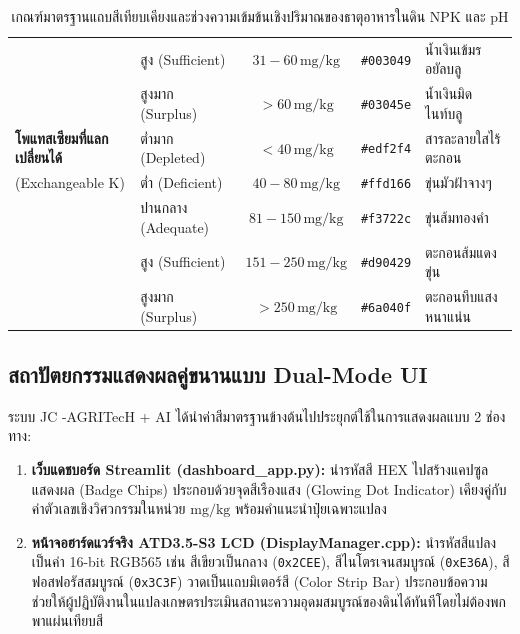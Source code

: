 \begin{table}[htbp]
\begin{tabularx}{\textwidth}{p{3.2cm} p{3.4cm} c c Y}
& สูง (Sufficient) & $31 - 60\,\text{mg/kg}$ & \texttt{\#003049} & น้ำเงินเข้มรอยัลบลู \\
& สูงมาก (Surplus) & $> 60\,\text{mg/kg}$ & \texttt{\#03045e} & น้ำเงินมิดไนท์บลู \\
\midrule
\textbf{โพแทสเซียมที่แลกเปลี่ยนได้} & ต่ำมาก (Depleted) & $< 40\,\text{mg/kg}$ & \texttt{\#edf2f4} & สารละลายใสไร้ตะกอน \\
(Exchangeable K) & ต่ำ (Deficient) & $40 - 80\,\text{mg/kg}$ & \texttt{\#ffd166} & ขุ่นมัวฝ้าจางๆ \\
& ปานกลาง (Adequate) & $81 - 150\,\text{mg/kg}$ & \texttt{\#f3722c} & ขุ่นส้มทองคำ \\
& สูง (Sufficient) & $151 - 250\,\text{mg/kg}$ & \texttt{\#d90429} & ตะกอนส้มแดงขุ่น \\
& สูงมาก (Surplus) & $> 250\,\text{mg/kg}$ & \texttt{\#6a040f} & ตะกอนทึบแสงหนาแน่น \\
\bottomrule
\end{tabularx}
\caption{เกณฑ์มาตรฐานแถบสีเทียบเคียงและช่วงความเข้มข้นเชิงปริมาณของธาตุอาหารในดิน NPK และ pH}
\label{tab:soil_color_chart_standards}
\end{table}

\subsection{สถาปัตยกรรมแสดงผลคู่ขนานแบบ Dual-Mode UI}

ระบบ JC -AGRITecH + AI ได้นำค่าสีมาตรฐานข้างต้นไปประยุกต์ใช้ในการแสดงผลแบบ 2 ช่องทาง:
\begin{enumerate}
    \item \textbf{เว็บแดชบอร์ด Streamlit (dashboard\_app.py):} นำรหัสสี HEX ไปสร้างแคปซูลแสดงผล (Badge Chips) ประกอบด้วยจุดสีเรืองแสง (Glowing Dot Indicator) เคียงคู่กับค่าตัวเลขเชิงวิศวกรรมในหน่วย $\text{mg/kg}$ พร้อมคำแนะนำปุ๋ยเฉพาะแปลง
    \item \textbf{หน้าจอฮาร์ดแวร์จริง ATD3.5-S3 LCD (DisplayManager.cpp):} นำรหัสสีแปลงเป็นค่า 16-bit RGB565 เช่น สีเขียวเป็นกลาง (\texttt{0x2CEE}), สีไนโตรเจนสมบูรณ์ (\texttt{0xE36A}), สีฟอสฟอรัสสมบูรณ์ (\texttt{0x3C3F}) วาดเป็นแถบมิเตอร์สี (Color Strip Bar) ประกอบข้อความ ช่วยให้ผู้ปฏิบัติงานในแปลงเกษตรประเมินสถานะความอุดมสมบูรณ์ของดินได้ทันทีโดยไม่ต้องพกพาแผ่นเทียบสี
\end{enumerate}

